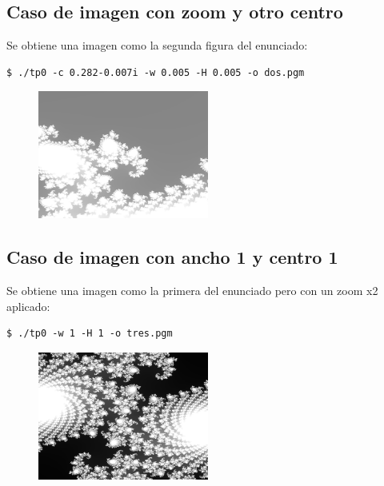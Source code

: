 \documentclass[a4paper,10pt]{article}
\begin{document}
\newpage

\subsection{Caso de imagen con zoom y otro centro}
Se obtiene una imagen como la segunda figura del enunciado:

\begin{lstlisting}[frame=single]
$ ./tp0 -c 0.282-0.007i -w 0.005 -H 0.005 -o dos.pgm
\end{lstlisting}

\begin{figure}[H]
\begin{center}
\includegraphics[width=0.5\textwidth]{imagenes/dos.png}
\caption{} \label{dos}
\end{center}
\end{figure}

\subsection{Caso de imagen con ancho 1 y centro 1}
Se obtiene una imagen como la primera del enunciado pero con un zoom x2 aplicado:

\begin{lstlisting}[frame=single]
$ ./tp0 -w 1 -H 1 -o tres.pgm
\end{lstlisting}

\begin{figure}[H]
\begin{center}
\includegraphics[width=0.5\textwidth]{imagenes/tres.png}
\caption{} \label{tres}
\end{center}
\end{figure}
\end{document}
